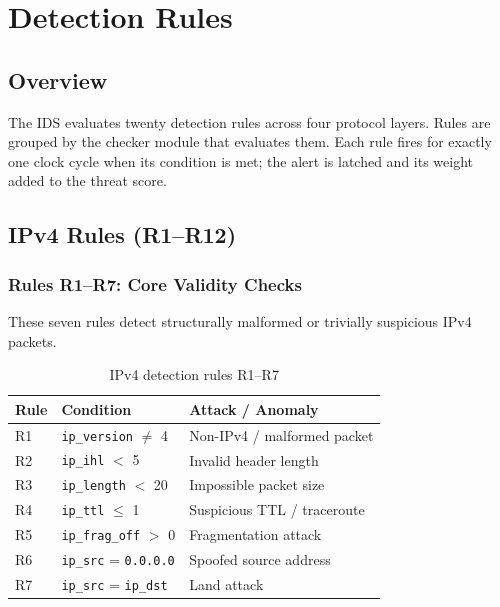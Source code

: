 \documentclass[12pt, a4paper]{report}
\begin{document}
\chapter{Detection Rules}
\label{ch:rules}

\section{Overview}

The IDS evaluates twenty detection rules across four protocol layers. Rules are grouped by the checker module that evaluates them. Each rule fires for exactly one clock cycle when its condition is met; the alert is latched and its weight added to the threat score.

\section{IPv4 Rules (R1--R12)}

\subsection{Rules R1--R7: Core Validity Checks}

These seven rules detect structurally malformed or trivially suspicious IPv4 packets.

\begin{table}[H]
\centering
\caption{IPv4 detection rules R1--R7}
\label{tab:r1r7}
\begin{tabular}{lll}
\toprule
\textbf{Rule} & \textbf{Condition} & \textbf{Attack / Anomaly} \\
\midrule
R1 & \texttt{ip\_version} $\neq$ 4          & Non-IPv4 / malformed packet \\
R2 & \texttt{ip\_ihl} $<$ 5                  & Invalid header length       \\
R3 & \texttt{ip\_length} $<$ 20              & Impossible packet size      \\
R4 & \texttt{ip\_ttl} $\leq$ 1              & Suspicious TTL / traceroute \\
R5 & \texttt{ip\_frag\_off} $>$ 0           & Fragmentation attack        \\
R6 & \texttt{ip\_src} = \texttt{0.0.0.0}   & Spoofed source address      \\
R7 & \texttt{ip\_src} = \texttt{ip\_dst}   & Land attack                 \\
\bottomrule
\end{tabular}
\end{table}
\end{document}
